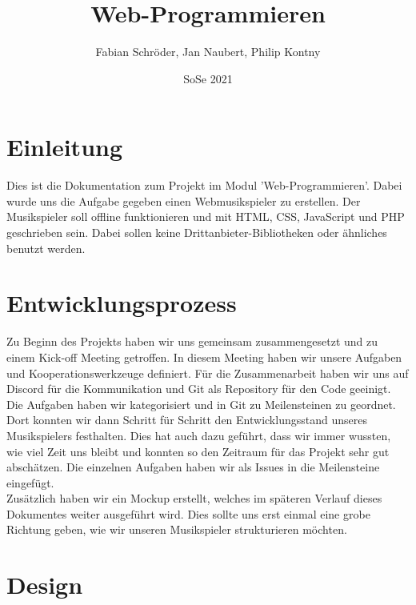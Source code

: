 \documentclass{article}
\title{Web-Programmieren}
\author{Fabian Schröder, Jan Naubert, Philip Kontny}
\date{SoSe 2021}
\begin{document}
\maketitle
\newpage
\tableofcontents
\newpage

\section{Einleitung}
Dies ist die Dokumentation zum Projekt im Modul 'Web-Programmieren'. Dabei wurde uns die Aufgabe gegeben einen Webmusikspieler zu erstellen. Der Musikspieler soll offline funktionieren und mit HTML, CSS, JavaScript und PHP geschrieben sein. Dabei sollen keine Drittanbieter-Bibliotheken oder ähnliches benutzt werden.

\section{Entwicklungsprozess}
Zu Beginn des Projekts haben wir uns gemeinsam zusammengesetzt und zu einem Kick-off Meeting getroffen. In diesem Meeting haben wir unsere Aufgaben und Kooperationswerkzeuge definiert. Für die Zusammenarbeit haben wir uns auf Discord für die Kommunikation und Git als Repository für den Code geeinigt. Die Aufgaben haben wir kategorisiert und in Git zu Meilensteinen zu geordnet. Dort konnten wir dann Schritt für Schritt den Entwicklungsstand unseres Musikspielers festhalten. Dies hat auch dazu geführt, dass wir immer wussten, wie viel Zeit uns bleibt und konnten so den Zeitraum für das Projekt sehr gut abschätzen. Die einzelnen Aufgaben haben wir als Issues in die Meilensteine eingefügt.\\
Zusätzlich haben wir ein Mockup erstellt, welches im späteren Verlauf dieses Dokumentes weiter ausgeführt wird. Dies sollte uns erst einmal eine grobe Richtung geben, wie wir unseren Musikspieler strukturieren möchten.

\newpage
\section{Design}
\end{document}
